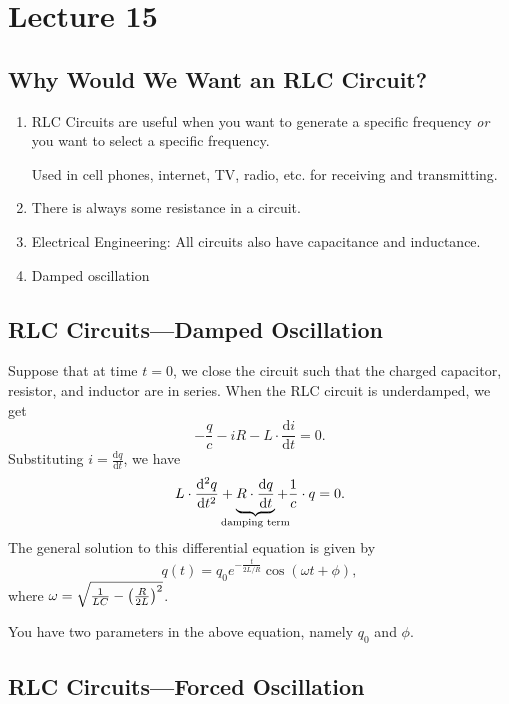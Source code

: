 \documentclass[class=article, crop=false]{standalone}
\begin{document}
  \section{Lecture 15}
  \subsection{Why Would We Want an RLC Circuit?}
  \begin{enumerate}
    \item RLC Circuits are useful when you want to generate a specific frequency \emph{or} you want to select a specific frequency.
    \begin{note}{}
      Used in cell phones, internet, TV, radio, etc. for receiving and transmitting.
    \end{note}
    \item There is always some resistance in a circuit.
    \item Electrical Engineering: All circuits also have capacitance and inductance.
    \item Damped oscillation
  \end{enumerate}
  \subsection{RLC Circuits---Damped Oscillation}
  Suppose that at time $t = 0$, we close the circuit such that the charged capacitor, resistor, and inductor are in series. When the RLC circuit is underdamped, we get
  \[
    - \frac{q}{c} - iR - L\cdot \frac{\mathrm{d}i}{\mathrm{d}t} = 0.
  \]
  Substituting $i = \frac{\mathrm{d}q}{\mathrm{d}t}$, we have
  \[
    L\cdot \frac{\mathrm{d}^2q}{\mathrm{d}t^2} + \underbrace{R\cdot \frac{\mathrm{d}q}{\mathrm{d}t}}_{\mathclap{\text{damping term}}} + \frac{1}{c}\cdot q = 0.
  \]
  The general solution to this differential equation is given by
  \[
    q(t) = q_0e^{-\frac{t}{2L/R}}\cos (\omega t + \phi),
  \]
  where $\omega = \sqrt{\frac{1}{LC} - \left( \frac{R}{2L} \right)^2}$.
  \begin{note}{}
    You have two parameters in the above equation, namely $q_0$ and $\phi$.
  \end{note}
  \subsection{RLC Circuits---Forced Oscillation}
\end{document}
